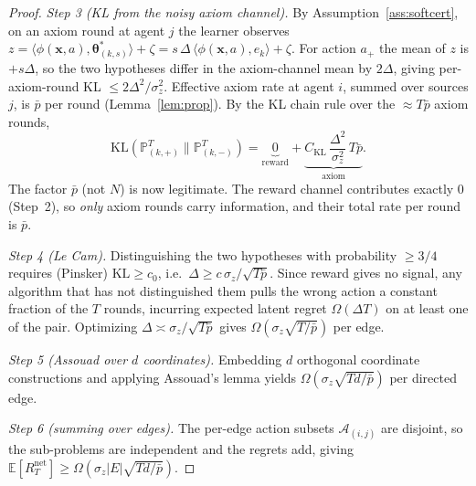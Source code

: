 \documentclass[11pt]{article}
\begin{document}
\begin{proof}
\textit{Step 3 (KL from the noisy axiom channel).}
By Assumption~\ref{ass:softcert}, on an axiom round at agent $j$ the
learner observes $z=\langle\phi(\bm{x},a),\bm{\theta}^{\!*}_{(k,s)}\rangle+\zeta
=s\,\Delta\,\langle\phi(\bm{x},a),e_k\rangle+\zeta$.  For action $a_+$
the mean of $z$ is $+s\Delta$, so the two hypotheses differ in the
axiom-channel mean by $2\Delta$, giving per-axiom-round KL
$\leq 2\Delta^2/\sigma_z^2$.  Effective axiom rate at agent $i$,
summed over sources $j$, is $\bar p$ per round
(Lemma~\ref{lem:prop}).  By the KL chain rule over the $\approx T\bar p$
axiom rounds,
\[
\mathrm{KL}(\mathbb{P}_{(k,+)}^T\|\mathbb{P}_{(k,-)}^T)
=\underbrace{0}_{\text{reward}}+\underbrace{C_{\mathrm{KL}}\,\frac{\Delta^2}{\sigma_z^2}\,T\bar p}_{\text{axiom}}.
\]
The factor $\bar p$ (not $N$) is now legitimate. The reward channel
contributes exactly $0$ (Step~2), so \emph{only} axiom rounds carry
information, and their total rate per round is $\bar p$.

\textit{Step 4 (Le Cam).}  Distinguishing the two hypotheses with
probability $\geq 3/4$ requires (Pinsker) $\mathrm{KL}\geq c_0$, i.e.\
$\Delta\geq c\,\sigma_z/\sqrt{T\bar p}$.  Since reward gives no signal,
any algorithm that has not distinguished them pulls the wrong action a
constant fraction of the $T$ rounds, incurring expected latent regret
$\Omega(\Delta T)$ on at least one of the pair. Optimizing
$\Delta\asymp\sigma_z/\sqrt{T\bar p}$ gives $\Omega(\sigma_z\sqrt{T/\bar p})$
per edge.

\textit{Step 5 (Assouad over $d$ coordinates).}
Embedding $d$ orthogonal coordinate constructions and applying
Assouad's lemma yields $\Omega(\sigma_z\sqrt{Td/\bar p})$ per directed
edge.

\textit{Step 6 (summing over edges).}
The per-edge action subsets $\mathcal{A}_{(i,j)}$ are disjoint, so the
sub-problems are independent and the regrets add, giving
$\mathbb{E}[R_T^{\mathrm{net}}]\geq\Omega(\sigma_z|E|\sqrt{Td/\bar p})$.
\qedhere
\end{proof}
\end{document}
